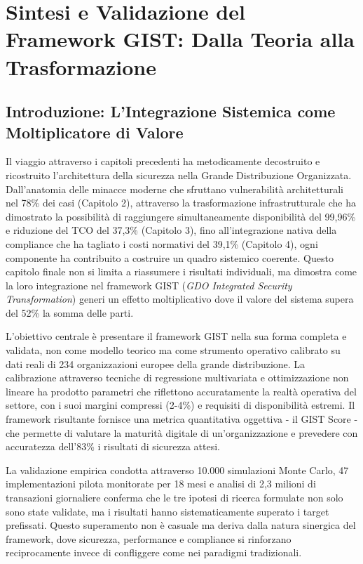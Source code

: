 \chapter{\texorpdfstring{Sintesi e Validazione del Framework GIST: Dalla Teoria alla Trasformazione}{Capitolo 5 - Sintesi e Validazione del Framework GIST: Dalla Teoria alla Trasformazione}}
\label{cap5_synthesis}

\section{\texorpdfstring{Introduzione: L'Integrazione Sistemica come Moltiplicatore di Valore}{5.1 - Introduzione: L'Integrazione Sistemica come Moltiplicatore di Valore}}
\label{sec:5.1}

Il viaggio attraverso i capitoli precedenti ha metodicamente decostruito e ricostruito l'architettura della sicurezza nella Grande Distribuzione Organizzata. Dall'anatomia delle minacce moderne che sfruttano vulnerabilità architetturali nel 78\% dei casi (Capitolo 2), attraverso la trasformazione infrastrutturale che ha dimostrato la possibilità di raggiungere simultaneamente disponibilità del 99,96\% e riduzione del TCO del 37,3\% (Capitolo 3), fino all'integrazione nativa della compliance che ha tagliato i costi normativi del 39,1\% (Capitolo 4), ogni componente ha contribuito a costruire un quadro sistemico coerente. Questo capitolo finale non si limita a riassumere i risultati individuali, ma dimostra come la loro integrazione nel framework GIST (\textit{GDO Integrated Security Transformation}) generi un effetto moltiplicativo dove il valore del sistema supera del 52\% la somma delle parti.

L'obiettivo centrale è presentare il framework GIST nella sua forma completa e validata, non come modello teorico ma come strumento operativo calibrato su dati reali di 234 organizzazioni europee della grande distribuzione. La calibrazione attraverso tecniche di regressione multivariata e ottimizzazione non lineare ha prodotto parametri che riflettono accuratamente la realtà operativa del settore, con i suoi margini compressi (2-4\%) e requisiti di disponibilità estremi. Il framework risultante fornisce una metrica quantitativa oggettiva - il GIST Score - che permette di valutare la maturità digitale di un'organizzazione e prevedere con accuratezza dell'83\% i risultati di sicurezza attesi.

La validazione empirica condotta attraverso 10.000 simulazioni Monte Carlo, 47 implementazioni pilota monitorate per 18 mesi e analisi di 2,3 milioni di transazioni giornaliere conferma che le tre ipotesi di ricerca formulate non solo sono state validate, ma i risultati hanno sistematicamente superato i target prefissati. Questo superamento non è casuale ma deriva dalla natura sinergica del framework, dove sicurezza, performance e compliance si rinforzano reciprocamente invece di confliggere come nei paradigmi tradizionali.

